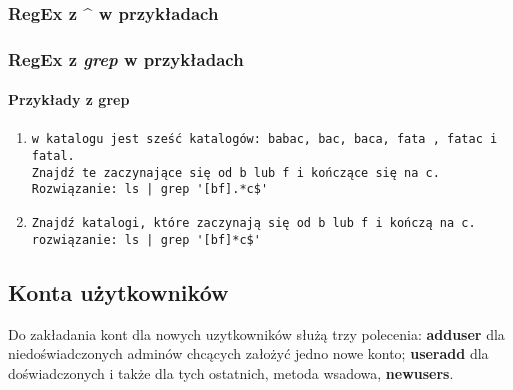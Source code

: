 \documentclass[a4paper,titlepage,12pt]{mwart}
\begin{document}
\subsubsection{RegEx z ^ w przykładach}

\subsubsection{RegEx z \textit{grep} w przykładach}

\paragraph{Przykłady z grep}
\begin{enumerate}
\item{\begin{verbatim}
w katalogu jest sześć katalogów: babac, bac, baca, fata , fatac i fatal.
Znajdź te zaczynające się od b lub f i kończące się na c.
Rozwiązanie: ls | grep '[bf].*c$'
\end{verbatim}}


\item{\begin{verbatim}
Znajdź katalogi, które zaczynają się od b lub f i kończą na c.
rozwiązanie: ls | grep '[bf]*c$'
\end{verbatim}}
\end{enumerate}
\subsection{Konta użytkowników}
Do zakładania kont dla nowych uzytkowników służą trzy polecenia: \textbf{adduser} dla niedoświadczonych adminów chcących założyć jedno nowe konto; \textbf{useradd} dla doświadczonych i także dla tych ostatnich, metoda wsadowa, \textbf{newusers}.
\end{document}
